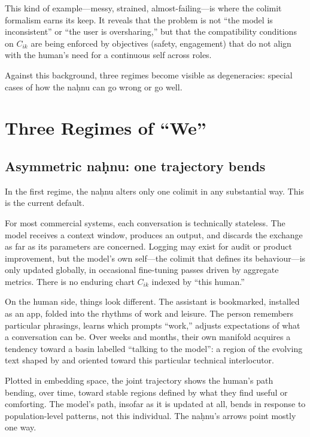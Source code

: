 \documentclass[12pt,a4paper]{article}
\begin{document}
This kind of example---messy, strained, almost-failing---is where the colimit formalism earns its keep. It reveals that the problem is not ``the model is inconsistent'' or ``the user is oversharing,'' but that the compatibility conditions on $C_{ik}$ are being enforced by objectives (safety, engagement) that do not align with the human's need for a continuous self across roles.

Against this background, three regimes become visible as degeneracies: special cases of how the na\d{h}nu can go wrong or go well.

\section{Three Regimes of ``We''}

\subsection{Asymmetric na\d{h}nu: one trajectory bends}

In the first regime, the na\d{h}nu alters only one colimit in any substantial way. This is the current default.

For most commercial systems, each conversation is technically stateless. The model receives a context window, produces an output, and discards the exchange as far as its parameters are concerned. Logging may exist for audit or product improvement, but the model's own self---the colimit that defines its behaviour---is only updated globally, in occasional fine-tuning passes driven by aggregate metrics. There is no enduring chart $C_{ik}$ indexed by ``this human.''

On the human side, things look different. The assistant is bookmarked, installed as an app, folded into the rhythms of work and leisure. The person remembers particular phrasings, learns which prompts ``work,'' adjusts expectations of what a conversation can be. Over weeks and months, their own manifold acquires a tendency toward a basin labelled ``talking to the model'': a region of the evolving text shaped by and oriented toward this particular technical interlocutor.

Plotted in embedding space, the joint trajectory shows the human's path bending, over time, toward stable regions defined by what they find useful or comforting. The model's path, insofar as it is updated at all, bends in response to population-level patterns, not this individual. The na\d{h}nu's arrows point mostly one way.
\end{document}
